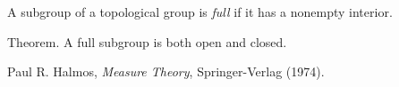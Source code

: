 \documentclass[12pt]{article}
\begin{document}
A subgroup of a topological group is \emph{full} if it has a nonempty interior.

Theorem. A full subgroup is both open and closed.

\begin{thebibliography}{99}
 Paul R. Halmos, \emph{Measure Theory}, Springer-Verlag (1974).
\end{thebibliography}
\end{document}
